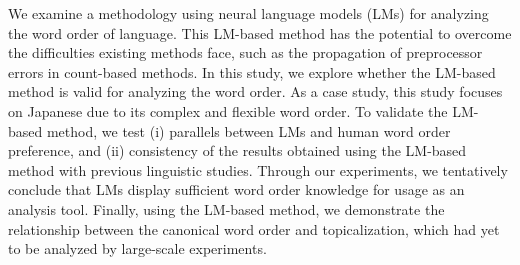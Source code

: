 We examine a methodology using neural language models (LMs) for analyzing the word order of language. This LM-based method has the potential to overcome the difficulties existing methods face, such as the propagation of preprocessor errors in count-based methods. In this study, we explore whether the LM-based method is valid for analyzing the word order. As a case study, this study focuses on Japanese due to its complex and flexible word order. To validate the LM-based method, we test (i) parallels between LMs and human word order preference, and (ii) consistency of the results obtained using the LM-based method with previous linguistic studies. Through our experiments, we tentatively conclude that LMs display sufficient word order knowledge for usage as an analysis tool. Finally, using the LM-based method, we demonstrate the relationship between the canonical word order and topicalization, which had yet to be analyzed by large-scale experiments.
